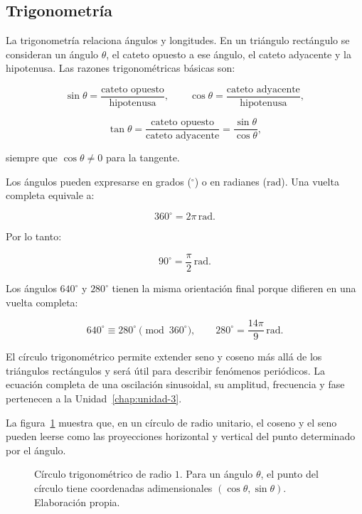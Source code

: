 \subsection{Trigonometría}
\label{sec:u1-trigonometria}

La trigonometría relaciona ángulos y longitudes. En un triángulo rectángulo se consideran un ángulo \(\theta\), el cateto opuesto a ese ángulo, el cateto adyacente y la hipotenusa. Las razones trigonométricas básicas son:

\[
    \sin\theta
    =\frac{\text{cateto opuesto}}{\text{hipotenusa}},
    \qquad
    \cos\theta
    =\frac{\text{cateto adyacente}}{\text{hipotenusa}},
\]

\[
    \tan\theta
    =\frac{\text{cateto opuesto}}{\text{cateto adyacente}}
    =\frac{\sin\theta}{\cos\theta},
\]

siempre que \(\cos\theta\neq0\) para la tangente.

Los ángulos pueden expresarse en grados (\(^{\circ}\)) o en radianes (\(\text{rad}\)). Una vuelta completa equivale a:

\[
    360^{\circ}=2\pi\,\text{rad}.
\]

Por lo tanto:

\[
    90^{\circ}=\frac{\pi}{2}\,\text{rad}.
\]

Los ángulos \(640^{\circ}\) y \(280^{\circ}\) tienen la misma orientación final porque difieren en una vuelta completa:

\[
    640^{\circ}\equiv280^{\circ}\pmod{360^{\circ}},
    \qquad
    280^{\circ}=\frac{14\pi}{9}\,\text{rad}.
\]

El círculo trigonométrico permite extender seno y coseno más allá de los triángulos rectángulos y será útil para describir fenómenos periódicos. La ecuación completa de una oscilación sinusoidal, su amplitud, frecuencia y fase pertenecen a la Unidad~\ref{chap:unidad-3}.

La figura~\ref{fig:circulo-trigonometrico} muestra que, en un círculo de radio unitario, el coseno y el seno pueden leerse como las proyecciones horizontal y vertical del punto determinado por el ángulo.

\begin{figure}[htbp]
    \centering
    
    \caption{Círculo trigonométrico de radio \(1\). Para un ángulo \(\theta\), el punto del círculo tiene coordenadas adimensionales \((\cos\theta,\sin\theta)\). Elaboración propia.}
    \label{fig:circulo-trigonometrico}
\end{figure}

